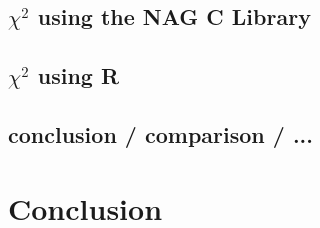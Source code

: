 \documentclass{article}
\begin{document}
\subsection{$\chi^2$ using the NAG C Library}
\subsection{$\chi^2$ using R}
\subsection{conclusion / comparison / ...}


\section{Conclusion}


\newpage
\nocite{*}


\end{document}
